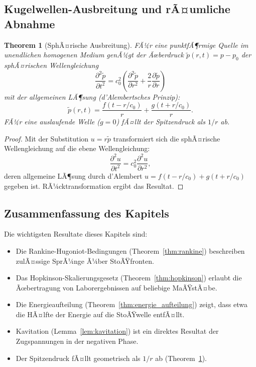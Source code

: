 ﻿\documentclass[12pt,a4paper]{article}
\newtheorem{theorem}{Theorem}[section]
\theoremstyle{definition}
\theoremstyle{remark}
\begin{document}
\subsection{Kugelwellen-Ausbreitung und rÃ¤umliche Abnahme}

\begin{theorem}[SphÃ¤rische Ausbreitung]
\label{thm:sphÃ¤risch}
FÃ¼r eine punktfÃ¶rmige Quelle im unendlichen homogenen Medium genÃ¼gt der Ãœberdruck $\tilde{p}(r,t) = p - p_0$ der sphÃ¤rischen Wellengleichung
\begin{equation}
\frac{\partial^2 \tilde{p}}{\partial t^2} = c_0^2 \left(\frac{\partial^2 \tilde{p}}{\partial r^2} + \frac{2}{r}\frac{\partial \tilde{p}}{\partial r}\right)
\end{equation}
mit der allgemeinen LÃ¶sung (d'Alembertsches Prinzip):
\begin{equation}
\tilde{p}(r,t) = \frac{f(t - r/c_0)}{r} + \frac{g(t + r/c_0)}{r}.
\end{equation}
FÃ¼r eine auslaufende Welle ($g = 0$) fÃ¤llt der Spitzendruck als $1/r$ ab.
\end{theorem}
\begin{proof}
Mit der Substitution $u = r\tilde{p}$ transformiert sich die sphÃ¤rische Wellengleichung auf die ebene Wellengleichung:
\[
\frac{\partial^2 u}{\partial t^2} = c_0^2 \frac{\partial^2 u}{\partial r^2},
\]
deren allgemeine LÃ¶sung durch d'Alembert $u = f(t-r/c_0) + g(t+r/c_0)$ gegeben ist. RÃ¼cktransformation ergibt das Resultat. 
\end{proof}

\subsection{Zusammenfassung des Kapitels}

Die wichtigsten Resultate dieses Kapitels sind:
\begin{itemize}
\item Die Rankine-Hugoniot-Bedingungen (Theorem~\ref{thm:rankine}) beschreiben zulÃ¤ssige SprÃ¼nge Ã¼ber StoÃŸfronten.
\item Das Hopkinson-Skalierungsgesetz (Theorem~\ref{thm:hopkinson}) erlaubt die Ãœbertragung von Laborergebnissen auf beliebige MaÃŸstÃ¤be.
\item Die Energieaufteilung (Theorem~\ref{thm:energie_aufteilung}) zeigt, dass etwa die HÃ¤lfte der Energie auf die StoÃŸwelle entfÃ¤llt.
\item Kavitation (Lemma~\ref{lem:kavitation}) ist ein direktes Resultat der Zugspannungen in der negativen Phase.
\item Der Spitzendruck fÃ¤llt geometrisch als $1/r$ ab (Theorem~\ref{thm:sphÃ¤risch}).
\end{itemize}
\end{document}
